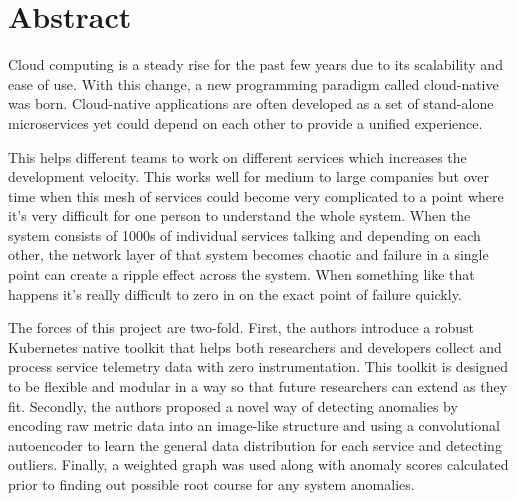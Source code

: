 \chapter*{Abstract}


Cloud computing is a steady rise for the past few years due to its scalability and ease of use. With this change, a new programming paradigm called cloud-native was born. Cloud-native applications are often developed as a set of stand-alone microservices yet could depend on each other to provide a unified experience. 

This helps different teams to work on different services which increases the development velocity. This works well for medium to large companies but over time when this mesh of services could become very complicated to a point where it's very difficult for one person to understand the whole system. When the system consists of 1000s of individual services talking and depending on each other, the network layer of that system becomes chaotic and failure in a single point can create a ripple effect across the system. When something like that happens it's really difficult to zero in on the exact point of failure quickly.

The forces of this project are two-fold. First, the authors introduce a robust Kubernetes native toolkit that helps both researchers and developers collect and process service telemetry data with zero instrumentation. This toolkit is designed to be flexible and modular in a way so that future researchers can extend as they fit. Secondly, the authors proposed a novel way of detecting anomalies by encoding raw metric data into an image-like structure and using a convolutional autoencoder to learn the general data distribution for each service and detecting outliers. Finally, a weighted graph was used along with anomaly scores calculated prior to finding out possible root course for any system anomalies.